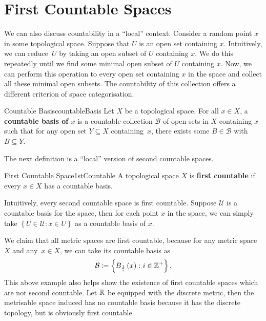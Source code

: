 \documentclass[math]{amznotes}
\theoremstyle{remark}
\begin{document}
\section{First Countable Spaces}
We can also discuss countability in a ``local'' context. Consider a random point $x$ in some topological space. Suppose that $U$ is an open set containing $x$. Intuitively, we can reduce~$U$ by taking an open subset of $U$ containing $x$. We do this repeatedly until we find some minimal open subset of $U$ containing $x$. Now, we can perform this operation to every open set containing $x$ in the space and collect all these minimal open subsets. The countability of this collection offers a different criterion of space categorisation.
\begin{dfnbox}{Countable Basis}{countableBasis}
    Let $X$ be a topological space. For all $x \in X$, a {\color{red} \textbf{countable basis of $x$}} is a countable collection $\mathcal{B}$ of open sets in $X$ containing $x$ such that for any open set $Y \subseteq X$ containing~$x$, there exists some $B \in \mathcal{B}$ with $B \subseteq Y$.
\end{dfnbox}
The next definition is a ``local'' version of second countable spaces.
\begin{dfnbox}{First Countable Space}{1stCountable}
    A topological space $X$ is {\color{red} \textbf{first countable}} if every $x \in X$ has a countable basis.
\end{dfnbox}
Intuitively, every second countable space is first countable. Suppose $\mathcal{U}$ is a countable basis for the space, then for each point $x$ in the space, we can simply take $\left\{U \in \mathcal{U} \colon x \in U\right\}$ as a countable basis of $x$.

We claim that all metric spaces are first countable, because for any metric space $X$ and any~$x \in X$, we can take its countable basis as 
\begin{equation*}
    \mathcal{B} \coloneqq \left\{B_{\frac{1}{i}}\left(x\right) \colon i \in \mathbb{Z}^+\right\}.
\end{equation*}
This above example also helps show the existence of first countable spaces which are not second countable. Let $\mathbb{R}$ be equipped with the discrete metric, then the metrisable space induced has no countable basis because it has the discrete topology, but is obviously first countable.
\end{document}
